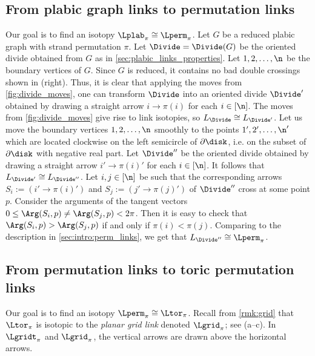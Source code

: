 \subsection{From plabic graph links to permutation links}
Our goal is to find an isotopy $\Lplab_\pi\cong \Lperm_\pi$. Let $G$ be a reduced plabic graph with strand permutation $\pi$. Let $\Divide=\Divide(G)$ be the oriented divide obtained from $G$ as in \cref{sec:plabic_links_properties}. Let $1,2,\dots,\n$ be the boundary vertices of $G$. Since $G$ is reduced, it contains no bad double crossings shown in (right). Thus, it is clear that applying the moves from \cref{fig:divide_moves}, one can transform $\Divide$ into an oriented divide $\Divide'$ obtained by drawing a straight arrow $i\to \pi(i)$ for each $i\in[\n]$. The moves from \cref{fig:divide_moves} give rise to link isotopies, so $L_\Divide\cong L_{\Divide'}$. Let us move the boundary vertices $1,2,\dots,\n$ smoothly to the points $1',2',\dots,\n'$ which are located clockwise on the left semicircle of $\partial \disk$, i.e.  on the subset of $\partial\disk$ with negative real part. Let $\Divide''$ be the oriented divide obtained by drawing a straight arrow $i'\to \pi(i)'$ for each $i\in[\n]$. It follows that $L_{\Divide'}\cong L_{\Divide''}$.
%
 Let $i,j\in[\n]$ be such that the corresponding arrows $S_i:=(i'\to \pi(i)')$ and $S_j:=(j'\to \pi(j)')$ of $\Divide''$ cross at some point $p$. Consider the arguments of the tangent vectors $0\leq \Arg(S_i,p)\neq\Arg(S_j,p)<2\pi$. Then it is easy to check that $\Arg(S_i,p)>\Arg(S_j,p)$ if and only if $\pi(i)<\pi(j)$. 
%
 Comparing to the description in \cref{sec:intro:perm_links}, we get that $L_{\Divide''}\cong\Lperm_\pi$.



\subsection{From permutation links to toric permutation links}\label{sec:perm-to-toric}
Our goal is to find an isotopy $\Lperm_\pi\cong\Ltor_\pi$. Recall from \cref{rmk:grid} that $\Ltor_\pi$ is isotopic to the \emph{planar grid link} denoted $\Lgrid_\pi$; see (a--c). In $\Lgridt_\pi$ and $\Lgrid_\pi$, the vertical arrows are drawn above the horizontal arrows. 

